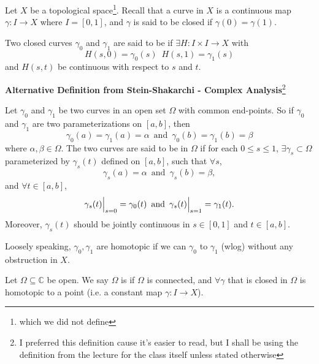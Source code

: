 \documentclass[11pt, oneside]{book}
\begin{document}
\begin{defn}\label{defn:homotopy}
  Let $X$ be a topological space\footnote{which we did not define}. Recall that a curve in $X$ is a continuous map $\gamma : I \to X$ where $I = [0, 1]$, and $\gamma$ is said to be closed if $\gamma(0) = \gamma(1)$.

  Two closed curves $\gamma_0$ and $\gamma_1$ are said to be  if $\exists H : I \times I \to X$ with
  \begin{equation*}
    H(s, 0) = \gamma_0(s) \enspace H(s, 1) = \gamma_1(s)
  \end{equation*}
  and $H(s, t)$ be continuous with respect to $s$ and $t$.

  \textbf{Alternative Definition from Stein-Shakarchi - Complex Analysis}\footnote{I preferred this definition cause it's easier to read, but I shall be using the definition from the lecture for the class itself unless stated otherwise}

  Let $\gamma_0$ and $\gamma_1$ be two curves in an open set $\Omega$ with common end-points. So if $\gamma_0$ and $\gamma_1$ are two parameterizations on $[a, b]$, then
  \begin{equation*}
    \gamma_0(a) = \gamma_1(a) = \alpha \enspace \text{and} \enspace \gamma_0(b) = \gamma_1(b) = \beta
  \end{equation*}
  where $\alpha, \beta \in \Omega$. The two curves are said to be  in $\Omega$ if for each $0 \leq s \leq 1$, $\exists \gamma_s \subset \Omega$ parameterized by $\gamma_s(t)$ defined on $[a, b]$, such that $\forall s$, 
  \begin{equation*}
    \gamma_s(a) = \alpha \enspace \text{and} \enspace \gamma_s(b) = \beta,
  \end{equation*}
  and $\forall t \in [a, b]$, 
  \begin{equation*}
    \gamma_s(t) \Big|_{s = 0}^{} = \gamma_0(t) \enspace \text{and} \enspace \gamma_s(t) \Big|_{s = 1}^{} = \gamma_1(t).
  \end{equation*}
  Moreover, $\gamma_s(t)$ should be jointly continuous in $s \in [0, 1]$ and $t \in [a, b]$.
\end{defn}

Loosely speaking, $\gamma_0, \gamma_1$ are homotopic if we can  $\gamma_0$ to $\gamma_1$ (wlog) without any obstruction in $X$.

\begin{defn}\label{defn:simply_connected_domain}
  Let $\Omega \subseteq \mathbb{C}$ be open. We say $\Omega$ is  if $\Omega$ is connected, and $\forall \gamma$ that is closed in $\Omega$ is homotopic to a point (i.e. a constant map $\gamma : I \to X$).
\end{defn}
\end{document}
